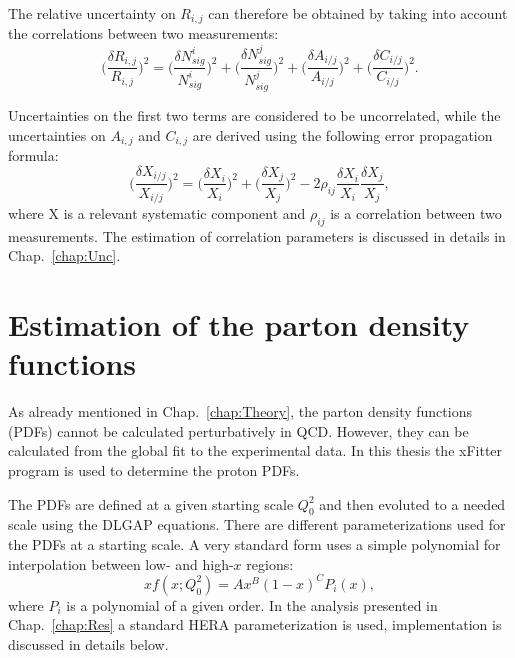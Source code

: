 The relative uncertainty on $R_{i,j}$ can therefore be obtained by taking into account the correlations between two measurements:
\begin{equation}
\Big(\frac{\delta R_{i,j} }{R_{i,j}}\Big)^2=\Big(\frac{\delta N^{i}_{sig}}{N^{i}_{sig}}\Big)^2+\Big(\frac{\delta N^{j}_{sig}}{N^{j}_{sig}}\Big)^2+\Big(\frac{\delta A_{i/j}}{A_{i/j}}\Big)^2+\Big(\frac{\delta C_{i/j}}{C_{i/j}}\Big)^2.
\end{equation}

Uncertainties on the first two terms are considered to be uncorrelated, while the uncertainties on $A_{i,j}$ and $C_{i,j}$ are derived using the following error propagation formula:
\begin{equation}
\Big(\frac{\delta X_{i/j} }{X_{i/j}}\Big)^2= \Big(\frac{\delta X_{i} }{X_{i}}\Big)^2+\Big(\frac{\delta X_{j} }{X_{j}}\Big)^2-2\rho_{ij}\frac{\delta X_{i}}{X_{i}}\frac{\delta X_{j}}{X_{j}},
\end{equation}
where X is a relevant systematic component and $\rho_{ij}$ is a correlation between two measurements. The estimation of correlation parameters is discussed in details in Chap.~\ref{chap:Unc}.


\section{Estimation of the parton density functions}\label{sec:PDFFit}

As already mentioned in Chap.~\ref{chap:Theory}, the parton density functions (PDFs) cannot be calculated perturbatively in QCD. However, they can be calculated from the global fit to the experimental data. In this thesis the xFitter program\cite{Xfitter} is used to determine the proton PDFs. 

The PDFs are defined at a given starting scale $Q^2_0$ and then evoluted to a needed scale using the DLGAP equations. There are different parameterizations used for the PDFs at a starting scale. A very standard form uses a simple polynomial for interpolation between low- and high-$x$ regions:
\begin{equation}
xf(x; Q^2_0) = A x^{B} (1-x)^{C} P_{i}(x),
\end{equation}
where $P_{i}$ is a polynomial of a given order. In the analysis presented in Chap.~\ref{chap:Res} a standard HERA parameterization is used, implementation is discussed in details below.

